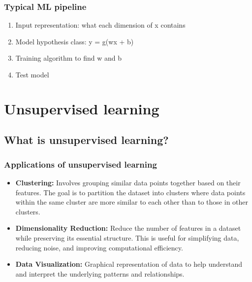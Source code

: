         \subsubsection{Typical ML pipeline}
            \begin{process}
                \begin{enumerate}
                    \item Input representation: what each dimension of x contains
                    \item Model hypothesis class: y = g(wx + b)
                    \item Training algorithm to find w and b
                    \item Test model
                \end{enumerate}
            \end{process}

\section{Unsupervised learning}
    \subsection{What is unsupervised learning?}
        \subsubsection{Applications of unsupervised learning}
            \begin{definition}
                \begin{itemize}
                    \item \textbf{Clustering:} Involves grouping similar data points together based on their features. The goal is to partition the dataset into clusters where data points within the same cluster are more similar to each other than to those in other clusters.
                    \item \textbf{Dimensionality Reduction:} Reduce the number of features in a dataset while preserving its essential structure. This is useful for simplifying data, reducing noise, and improving computational efficiency. 
                    \item \textbf{Data Visualization:} Graphical representation of data to help understand and interpret the underlying patterns and relationships. 
                \end{itemize}
            \end{definition}

